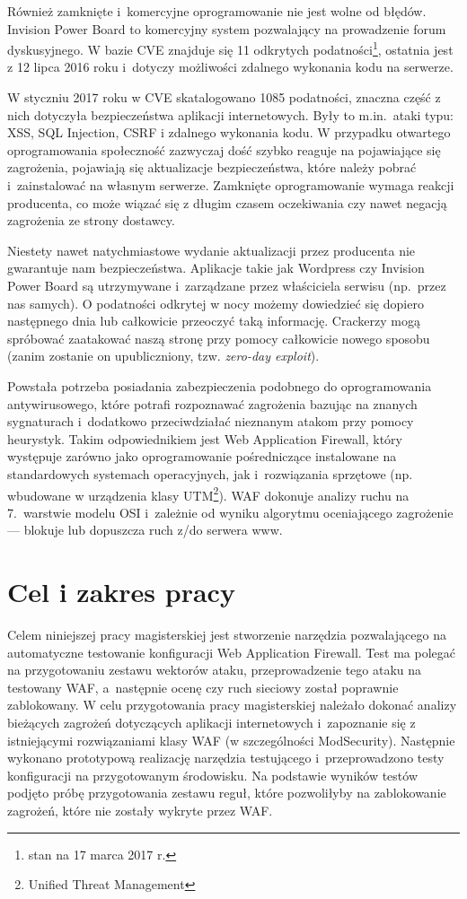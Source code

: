 \documentclass[11pt,a4paper,polish,thesis]{dcsbook}
\begin{document}
Również zamknięte i~komercyjne oprogramowanie nie jest wolne od błędów. Invision Power Board\cite{ipb} to komercyjny system pozwalający na prowadzenie forum dyskusyjnego. W bazie CVE znajduje się 11 odkrytych podatności\footnote{stan na 17 marca 2017 r.}, ostatnia jest z 12 lipca 2016 roku i~dotyczy możliwości zdalnego wykonania kodu na serwerze.

W styczniu 2017 roku w CVE skatalogowano 1085 podatności, znaczna część z nich dotyczyła bezpieczeństwa aplikacji internetowych. Były to m.in.\ ataki typu: XSS, SQL Injection, CSRF i zdalnego wykonania kodu. W przypadku otwartego oprogramowania społeczność zazwyczaj dość szybko reaguje na pojawiające się zagrożenia, pojawiają się aktualizacje bezpieczeństwa, które należy pobrać i~zainstalować na własnym serwerze. Zamknięte oprogramowanie wymaga reakcji producenta, co może wiązać się z długim czasem oczekiwania czy nawet negacją zagrożenia ze strony dostawcy.

Niestety nawet natychmiastowe wydanie aktualizacji przez producenta nie gwarantuje nam bezpieczeństwa. Aplikacje takie jak Wordpress czy Invision Power Board są utrzymywane i~zarządzane przez właściciela serwisu (np.\ przez nas samych). O podatności odkrytej w nocy możemy dowiedzieć się dopiero następnego dnia lub całkowicie przeoczyć taką informację. Crackerzy mogą spróbować zaatakować naszą stronę przy pomocy całkowicie nowego sposobu (zanim zostanie on upubliczniony, tzw. \textit{zero-day exploit}).

Powstała potrzeba posiadania zabezpieczenia podobnego do oprogramowania antywirusowego, które potrafi rozpoznawać zagrożenia bazując na znanych sygnaturach i~dodatkowo przeciwdziałać nieznanym atakom przy pomocy heurystyk. Takim odpowiednikiem jest Web Application Firewall, który występuje zarówno jako oprogramowanie pośredniczące instalowane na standardowych systemach operacyjnych, jak i~rozwiązania sprzętowe (np. wbudowane w urządzenia klasy UTM\footnote{Unified Threat Management}). WAF dokonuje analizy ruchu na 7.~warstwie modelu OSI i~zależnie od wyniku algorytmu oceniającego zagrożenie --- blokuje lub dopuszcza ruch z/do serwera www.  

\section*{Cel i zakres pracy}
Celem niniejszej pracy magisterskiej jest stworzenie narzędzia pozwalającego na automatyczne testowanie konfiguracji Web Application Firewall. Test ma polegać na przygotowaniu zestawu wektorów ataku, przeprowadzenie tego ataku na testowany WAF, a~następnie ocenę czy ruch sieciowy został poprawnie zablokowany. W celu przygotowania pracy magisterskiej należało dokonać analizy bieżących zagrożeń dotyczących aplikacji internetowych i~zapoznanie się z istniejącymi rozwiązaniami klasy WAF (w szczególności ModSecurity\cite{modsec}). Następnie wykonano prototypową realizację narzędzia testującego i~przeprowadzono testy konfiguracji na przygotowanym środowisku. Na podstawie wyników testów podjęto próbę przygotowania zestawu reguł, które pozwoliłyby na zablokowanie zagrożeń, które nie zostały wykryte przez WAF.
\end{document}
